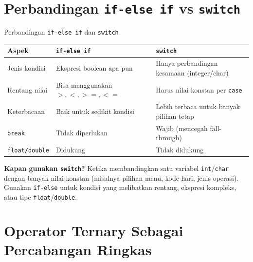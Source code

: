 \documentclass[../main.tex]{subfiles}
\begin{document}




\section{Perbandingan \texttt{if-else if} vs \texttt{switch}}

\begin{modultable}[]{Perbandingan \texttt{if-else if} dan \texttt{switch}}
{\small
\begin{tabular}{|>{\raggedright\arraybackslash}p{3.2cm}|>{\raggedright\arraybackslash}p{4.6cm}|>{\raggedright\arraybackslash}p{4.6cm}|}
\hline
\textbf{Aspek} & \texttt{\textbf{if-else if}} & \texttt{\textbf{switch}} \\
\hline
Jenis kondisi & Ekspresi boolean apa pun & Hanya perbandingan kesamaan (integer/char) \\
\hline
Rentang nilai & Bisa menggunakan $>, <, >=, <=$ & Harus nilai konstan per \texttt{case} \\
\hline
Keterbacaan & Baik untuk sedikit kondisi & Lebih terbaca untuk banyak pilihan tetap \\
\hline
\texttt{break} & Tidak diperlukan & Wajib (mencegah fall-through) \\
\hline
\texttt{float/double} & Didukung & Tidak didukung \\
\hline
\end{tabular}
}
\end{modultable}

\begin{konsep}
\textbf{Kapan gunakan \texttt{switch}?} Ketika membandingkan satu variabel \texttt{int}/\texttt{char} dengan banyak nilai konstan (misalnya pilihan menu, kode hari, jenis operasi). Gunakan \texttt{if-else} untuk kondisi yang melibatkan rentang, ekspresi kompleks, atau tipe \texttt{float}/\texttt{double}.
\end{konsep}

\section{Operator Ternary Sebagai Percabangan Ringkas}
\end{document}
